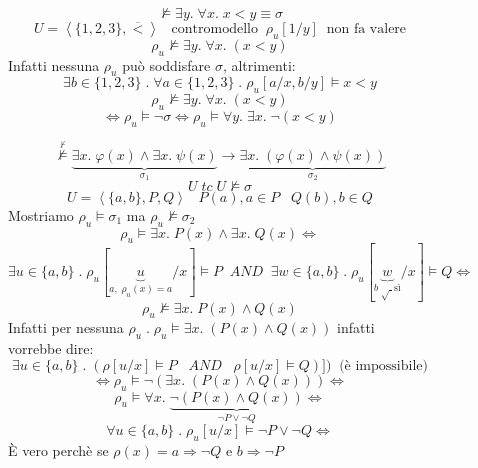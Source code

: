 \documentclass{article}
\theoremstyle{break}
\theoremstyle{break}
\theoremstyle{break}
\theoremstyle{break}
\begin{document}
  \begin{figure}[H]
    \begin{exercise}[a casa]
      \[
        \not\models \exists y.\; \forall x.\; x < y \equiv \sigma 
      \] 
      \[
        U = \left< \{1,2,3\}, \overline{<}\right> \;\;\; \text{contromodello} \;\; \rho_u[1/y] \;\; \text{non fa valere}
      \] 
      \[
        \rho_u \not\models \exists y.\; \forall x.\; (x < y)
      \] 
      Infatti nessuna \( \rho_u \) può soddisfare \( \sigma  \), altrimenti:
      \[
        \exists b \in \{1, 2, 3\} \;.\; \forall a \in \{1,2,3\} \;.\; \rho_u[a/x,b/y] \models x < y 
      \] 
      \[
        \rho_u \not\models \exists y.\; \forall x.\; (x < y)
      \] 
      \[
        \Leftrightarrow \rho_u \models \neg \sigma \Leftrightarrow \rho_u \models \forall y.\; \exists x.\; \neg(x < y)
      \] 
    \end{exercise}
  \end{figure}

  \begin{figure}[H]
    \begin{exercise}
      \[
        \stackrel{\not\vdash}{\not\models} \underbrace{\exists x.\; \varphi(x) \wedge \exists x.\; \psi(x)}_{\sigma_1} \to \underbrace{\exists x.\; (\varphi(x) \wedge \psi(x))}_{\sigma_2}
      \]
      \[
        U \;tc\; U \not\models \sigma 
      \] 
      \[
        U = \left<\{a,b\}, P, Q\right> \;\;\; P(a), a \in P \;\;\; Q(b), b \in Q
      \] 
      Mostriamo \( \rho_u \models \sigma_1  \) ma \( \rho_u \not\models \sigma_2 \)
      \[
        \rho_u \models \exists x.\; P(x) \wedge \exists x.\; Q(x) \Leftrightarrow
      \] 
      \[
        \exists u \in \{a,b\} \;.\; \rho_u[\underbrace{u}_{a,\; \rho_u(x) = a}/x] \models P \;\;AND\;\; \exists w \in \{a,b\} \;.\; \rho_u[\underbrace{w}_{b\; \surd\; \text{sì}}/x] \models Q \Leftrightarrow
      \] 
      \[
        \rho_u \not\models \exists x.\; P(x) \wedge Q(x)
      \] 
      Infatti per nessuna \( \rho_u \;.\; \rho_u \models \exists x.\; (P(x) \wedge Q(x))\) infatti
      vorrebbe dire:
      \[
        \exists u \in \{a,b\} \;.\; (\rho[u/x] \models P \;\;\; AND \;\;\; \rho[u/x] \models Q)])\;\;\text{(è impossibile)}
      \] 
      \[
        \Leftrightarrow \rho_u \models \neg(\exists x.\; (P(x) \wedge Q(x))) \Leftrightarrow
      \] 
      \[
        \rho_u \models \forall x.\; \underbrace{\neg(P(x) \wedge Q(x))}_{\neg P \vee \neg Q} \Leftrightarrow
      \] 
      \[
        \forall u \in \{a,b\} \;.\; \rho_u[u/x] \models \neg P \vee \neg Q \Leftrightarrow
      \] 
      È vero perchè se \( \rho(x) = a \Rightarrow \neg Q \)  e \( b \Rightarrow \neg P \) 
    \end{exercise}
  \end{figure}
\end{document}
